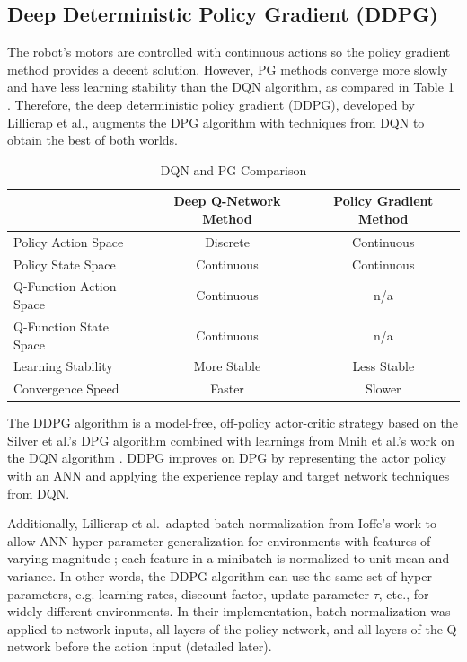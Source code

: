 \subsection{Deep Deterministic Policy Gradient (DDPG)}
The robot's motors are controlled with continuous actions so the policy gradient method provides a decent solution. However, PG methods converge more slowly and have less learning stability than the DQN algorithm, as compared in Table \ref{tab:dqn_pg_comparison} \cite{yu_dqn_vs_pg}. Therefore, the deep deterministic policy gradient (DDPG), developed by Lillicrap et al., augments the DPG algorithm with techniques from DQN to obtain the best of both worlds.
\begin{table}[h]
	\caption{DQN and PG Comparison \cite{yu_dqn_vs_pg}}  \label{tab:dqn_pg_comparison}
	\begin{tabularx}{\textwidth}{@{} l|c|c @{}}
		\toprule
		& Deep Q-Network Method & Policy Gradient Method \\ 
		\midrule
		Policy Action Space & Discrete & Continuous \\
		Policy State Space & Continuous & Continuous \\
		Q-Function Action Space & Continuous & n/a \\
		Q-Function State Space & Continuous & n/a \\
		Learning Stability & More Stable & Less Stable \\
		Convergence Speed & Faster & Slower \\
		\bottomrule
	\end{tabularx} 
\end{table}

The DDPG algorithm is a model-free, off-policy actor-critic strategy based on the Silver et al.'s DPG algorithm combined with learnings from Mnih et al.'s work on the DQN algorithm \cite{lillicrap_2016}\cite{Mnih_2015}\cite{silver_lever_heess_degris_wierstra_riedmiller}. DDPG improves on DPG by representing the actor policy with an ANN and applying the experience replay and target network techniques from DQN. 

Additionally, Lillicrap et al.\ adapted batch normalization from Ioffe's work to allow ANN hyper-parameter generalization for environments with features of varying magnitude \cite{2015arXiv150203167I}; each feature in a minibatch is normalized to unit mean and variance. In other words, the DDPG algorithm can use the same set of hyper-parameters, e.g. learning rates, discount factor, update parameter $\tau$, etc., for widely different environments. In their implementation, batch normalization was applied to network inputs, all layers of the policy network, and all layers of the Q network before the action input (detailed later).

